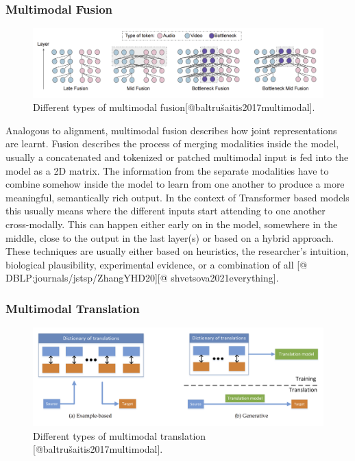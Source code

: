 \documentclass[
]{krantz}
\begin{document}
\hypertarget{multimodal-fusion}{%
\subsubsection{Multimodal Fusion}\label{multimodal-fusion}}

\begin{figure}

{\centering \includegraphics[width=1\linewidth]{figures/03-01/fusion} 

}

\caption{Different types of multimodal fusion[@baltrušaitis2017multimodal].}\label{fig:fusion}
\end{figure}

Analogous to alignment, multimodal fusion describes how joint representations are learnt. Fusion describes the process of merging modalities inside the model, usually a concatenated and tokenized or patched multimodal input is fed into the model as a 2D matrix. The information from the separate modalities have to combine somehow inside the model to learn from one another to produce a more meaningful, semantically rich output. In the context of Transformer \citep{DBLP:conf/nips/VaswaniSPUJGKP17} based models this usually means where the different inputs start attending to one another cross-modally. This can happen either early on in the model, somewhere in the middle, close to the output in the last layer(s) or based on a hybrid approach. These techniques are usually either based on heuristics, the researcher's intuition, biological plausibility, experimental evidence, or a combination of all \citep{DBLP:conf/nips/NagraniYAJSS21}{[}@ DBLP:journals/jstsp/ZhangYHD20{]}{[}@ shvetsova2021everything{]}.

\hypertarget{multimodal-translation}{%
\subsubsection{Multimodal Translation}\label{multimodal-translation}}

\begin{figure}

{\centering \includegraphics[width=1\linewidth]{figures/03-01/translation} 

}

\caption{Different types of multimodal translation [@baltrušaitis2017multimodal].}\label{fig:translation}
\end{figure}
\end{document}
